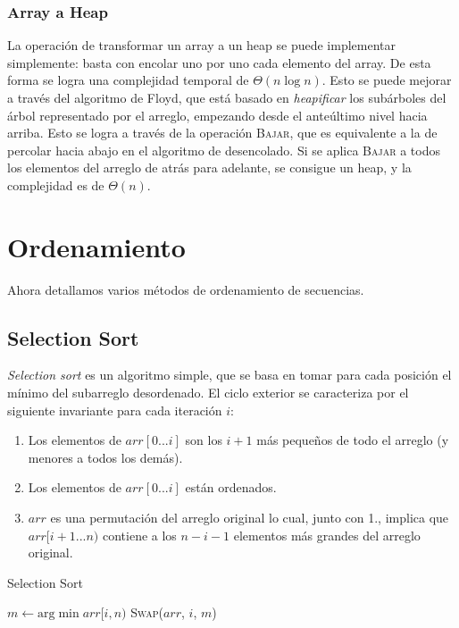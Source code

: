 \documentclass{article}
\newcommand{\BigTheta}[1]{{\Theta(#1)}}
\begin{document}
\subsubsection{Array a Heap}
\label{subsubsec-floyd}

La operación de transformar un array a un heap se puede implementar simplemente: basta con encolar uno por uno cada elemento del array. De esta forma se logra una complejidad temporal de $\BigTheta{n\log{n}}$. Esto se puede mejorar a través del algoritmo de Floyd, que está basado en \textit{heapificar} los subárboles del árbol representado por el arreglo, empezando desde el anteúltimo nivel hacia arriba. Esto se logra a través de la operación \textsc{Bajar}, que es equivalente a la de percolar hacia abajo en el algoritmo de desencolado. Si se aplica \textsc{Bajar} a todos los elementos del arreglo de atrás para adelante, se consigue un heap, y la complejidad es de $\BigTheta{n}$.

\section{Ordenamiento}

Ahora detallamos varios métodos de ordenamiento de secuencias.

\subsection{Selection Sort}

\textit{Selection sort} es un algoritmo simple, que se basa en tomar para cada posición el mínimo del subarreglo desordenado. El ciclo exterior se caracteriza por el siguiente invariante para cada iteración $i$:
\begin{enumerate}
    \item Los elementos de $arr[0...i]$ son los $i+1$ más pequeños de todo el arreglo (y menores a todos los demás).
    \item Los elementos de $arr[0...i]$ están ordenados.
    \item $arr$ es una permutación del arreglo original lo cual, junto con 1., implica que $arr[i+1...n)$ contiene a los $n - i - 1$ elementos más grandes del arreglo original.
\end{enumerate}

\begin{algorithm}[H]
    \caption*{Selection Sort}
    \begin{algorithmic}
        \State $m \gets \text{arg} \min{arr[i, n)}$
        \State \textsc{Swap}($arr$, $i$, $m$)
        \EndFor
    \end{algorithmic}
\end{algorithm}
\end{document}
